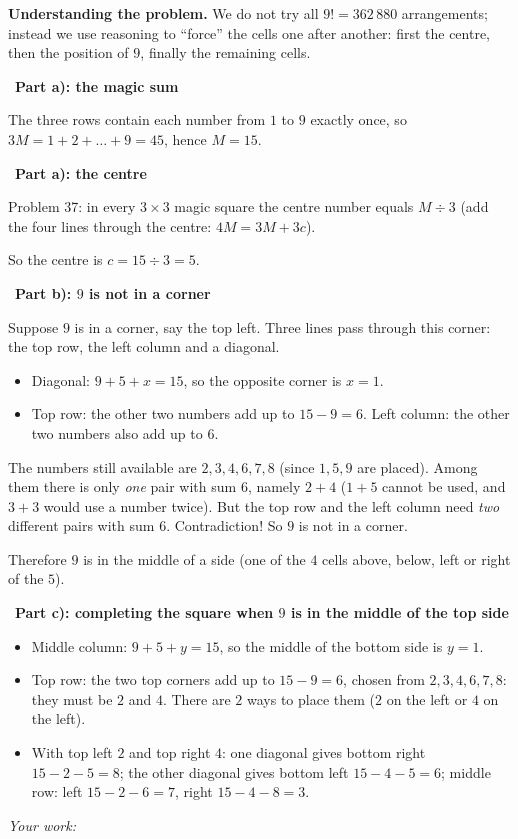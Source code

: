 \documentclass[11pt]{article}
\newif\ifsol \solfalse
\newcommand{\StuProb}[2]{\begin{probboxS}{#1}{#2}\StuProbBody\end{probboxS}}
\newcommand{\probsol}[1]{%
  \begin{lrbox}{\solmeasure}\begin{minipage}{\dimexpr\linewidth-24pt\relax}#1\end{minipage}\end{lrbox}%
  \ifsol
    \begin{solbox}#1\end{solbox}%
  \else
    \setlength{\solht}{\dimexpr\ht\solmeasure+\dp\solmeasure+0.85cm\relax}%
    \ifdim\solht<1.35cm\setlength{\solht}{1.35cm}\fi
    \ifdim\solht>\StudentMaxWork\setlength{\solht}{\StudentMaxWork}\fi
    \par\noindent\begin{minipage}{\linewidth}%
    \expandafter\StuProb\StuProbArgs
    \begin{tcolorbox}[colback=white,colframe=Line,boxrule=0.8pt,arc=5pt,
      left=8pt,right=8pt,top=4pt,bottom=4pt,height=\solht]{\footnotesize\color{Slate}\itshape\WorkWord}\end{tcolorbox}%
    \end{minipage}\par\medskip
  \fi}
\newlength{\StudentMaxWork}\setlength{\StudentMaxWork}{4.5cm}
\newcommand{\step}[2]{\par\smallskip\noindent{\bfseries\color{tmBlue!85!black}\StepWord~#1.}\ {\bfseries #2}\par\nopagebreak}
\def\WorkWord{Your work:}
\def\StepWord{Step}
\begin{document}
\probsol{
\textbf{Understanding the problem.} We do not try all $9! = 362\,880$ arrangements; instead we use reasoning to ``force'' the cells one
after another: first the centre, then the position of $9$, finally the remaining cells.
\step{1}{Part a): the magic sum}
The three rows contain each number from $1$ to $9$ exactly once, so $3M = 1 + 2 + \dots + 9 = 45$, hence $M = 15$.
\step{2}{Part a): the centre}
\begin{recallbox}Problem 37: in every $3\times 3$ magic square the centre number equals $M \div 3$ (add the four lines through the
centre: $4M = 3M + 3c$).\end{recallbox}
So the centre is $c = 15 \div 3 = 5$.
\step{3}{Part b): $9$ is not in a corner}
\begin{proofbox}Suppose $9$ is in a corner, say the top left. Three lines pass through this corner: the top row, the left column and a
diagonal.
\begin{itemize}[leftmargin=1.4em,itemsep=0pt,topsep=1pt]
  \item Diagonal: $9 + 5 + x = 15$, so the opposite corner is $x = 1$.
  \item Top row: the other two numbers add up to $15 - 9 = 6$. Left column: the other two numbers also add up to $6$.
\end{itemize}
The numbers still available are $2, 3, 4, 6, 7, 8$ (since $1, 5, 9$ are placed). Among them there is only \emph{one} pair with sum $6$,
namely $2 + 4$ ($1 + 5$ cannot be used, and $3 + 3$ would use a number twice). But the top row and the left column need \emph{two}
different pairs with sum $6$. Contradiction! So $9$ is not in a corner.\end{proofbox}
Therefore $9$ is in the middle of a side (one of the $4$ cells above, below, left or right of the $5$).
\step{4}{Part c): completing the square when $9$ is in the middle of the top side}
\begin{itemize}[leftmargin=1.4em,itemsep=0pt,topsep=1pt]
  \item Middle column: $9 + 5 + y = 15$, so the middle of the bottom side is $y = 1$.
  \item Top row: the two top corners add up to $15 - 9 = 6$, chosen from $2, 3, 4, 6, 7, 8$: they must be $2$ and $4$. There are $2$
  ways to place them ($2$ on the left or $4$ on the left).
  \item With top left $2$ and top right $4$: one diagonal gives bottom right $15 - 2 - 5 = 8$; the other diagonal gives bottom left
  $15 - 4 - 5 = 6$; middle row: left $15 - 2 - 6 = 7$, right $15 - 4 - 8 = 3$.

\end{itemize}}
\end{document}
